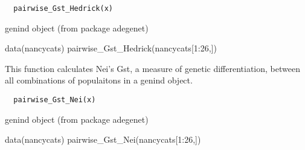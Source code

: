 \documentclass[letterpaper]{book}
\begin{document}
\begin{Usage}
\begin{verbatim}
  pairwise_Gst_Hedrick(x)
\end{verbatim}
\end{Usage}
%
\begin{Arguments}
\begin{ldescription}
\item[\code{x}] genind object (from package adegenet)
\end{ldescription}
\end{Arguments}
%
\begin{Examples}
\begin{ExampleCode}
data(nancycats)
pairwise_Gst_Hedrick(nancycats[1:26,])
\end{ExampleCode}
\end{Examples}
%
\begin{Description}\relax
This function calculates Nei's Gst, a measure of genetic
differentiation, between all combinations of populaitons
in a genind object.
\end{Description}
%
\begin{Usage}
\begin{verbatim}
  pairwise_Gst_Nei(x)
\end{verbatim}
\end{Usage}
%
\begin{Arguments}
\begin{ldescription}
\item[\code{x}] genind object (from package adegenet)
\end{ldescription}
\end{Arguments}
%
\begin{Examples}
\begin{ExampleCode}
data(nancycats)
pairwise_Gst_Nei(nancycats[1:26,])
\end{ExampleCode}
\end{Examples}
\printindex{}
\end{document}
